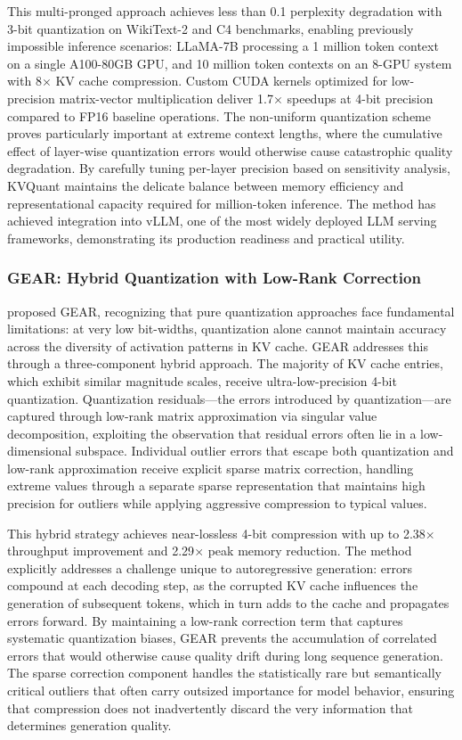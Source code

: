 \documentclass[11pt,letterpaper]{article}
\begin{document}
This multi-pronged approach achieves less than 0.1 perplexity degradation with 3-bit quantization on WikiText-2 and C4 benchmarks, enabling previously impossible inference scenarios: LLaMA-7B processing a 1 million token context on a single A100-80GB GPU, and 10 million token contexts on an 8-GPU system with 8$\times$ KV cache compression. Custom CUDA kernels optimized for low-precision matrix-vector multiplication deliver 1.7$\times$ speedups at 4-bit precision compared to FP16 baseline operations. The non-uniform quantization scheme proves particularly important at extreme context lengths, where the cumulative effect of layer-wise quantization errors would otherwise cause catastrophic quality degradation. By carefully tuning per-layer precision based on sensitivity analysis, KVQuant maintains the delicate balance between memory efficiency and representational capacity required for million-token inference. The method has achieved integration into vLLM, one of the most widely deployed LLM serving frameworks, demonstrating its production readiness and practical utility.

\subsubsection{GEAR: Hybrid Quantization with Low-Rank Correction}

\cite{kang2024gear} proposed GEAR, recognizing that pure quantization approaches face fundamental limitations: at very low bit-widths, quantization alone cannot maintain accuracy across the diversity of activation patterns in KV cache. GEAR addresses this through a three-component hybrid approach. The majority of KV cache entries, which exhibit similar magnitude scales, receive ultra-low-precision 4-bit quantization. Quantization residuals---the errors introduced by quantization---are captured through low-rank matrix approximation via singular value decomposition, exploiting the observation that residual errors often lie in a low-dimensional subspace. Individual outlier errors that escape both quantization and low-rank approximation receive explicit sparse matrix correction, handling extreme values through a separate sparse representation that maintains high precision for outliers while applying aggressive compression to typical values.

This hybrid strategy achieves near-lossless 4-bit compression with up to 2.38$\times$ throughput improvement and 2.29$\times$ peak memory reduction. The method explicitly addresses a challenge unique to autoregressive generation: errors compound at each decoding step, as the corrupted KV cache influences the generation of subsequent tokens, which in turn adds to the cache and propagates errors forward. By maintaining a low-rank correction term that captures systematic quantization biases, GEAR prevents the accumulation of correlated errors that would otherwise cause quality drift during long sequence generation. The sparse correction component handles the statistically rare but semantically critical outliers that often carry outsized importance for model behavior, ensuring that compression does not inadvertently discard the very information that determines generation quality.
\end{document}
